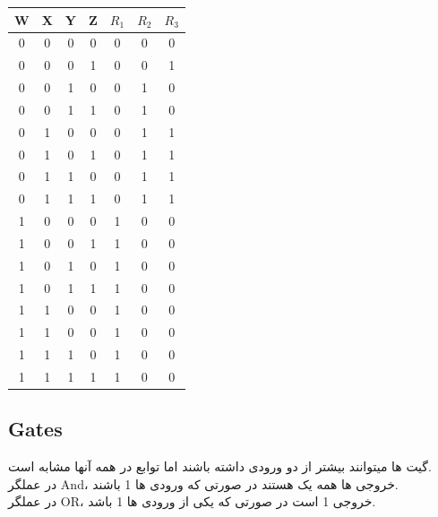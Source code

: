\documentclass[20pt, a4paper]{article}
\begin{document}
\begin{LTR}
	\begin{tabular}{ c c c c | c | c | c}
		W & X & Y & Z & $R_{1}$ & $R_{2}$ & $R_{3}$ \\
		\hline
		0 & 0 & 0 & 0 & 0 & 0 & 0\\
		0 & 0 & 0 & 1 & 0 & 0 & 1\\
		0 & 0 & 1 & 0 & 0 & 1 & 0\\
		0 & 0 & 1 & 1 & 0 & 1 & 0\\
		0 & 1 & 0 & 0 & 0 & 1 & 1\\
		0 & 1 & 0 & 1 & 0 & 1 & 1\\
		0 & 1 & 1 & 0 & 0 & 1 & 1\\
		0 & 1 & 1 & 1 & 0 & 1 & 1\\
		1 & 0 & 0 & 0 & 1 & 0 & 0\\
		1 & 0 & 0 & 1 & 1 & 0 & 0\\
		1 & 0 & 1 & 0 & 1 & 0 & 0\\
		1 & 0 & 1 & 1 & 1 & 0 & 0\\
		1 & 1 & 0 & 0 & 1 & 0 & 0\\
		1 & 1 & 0 & 0 & 1 & 0 & 0\\
		1 & 1 & 1 & 0 & 1 & 0 & 0\\
		1 & 1 & 1 & 1 & 1 & 0 & 0
	\end{tabular}
\end{LTR}



\subsection{Gates}
گیت ها میتوانند بیشتر از دو ورودی داشته باشند اما توابع در همه آنها مشابه است.\\
در عملگر And، خروجی ها همه یک هستند در صورتی که ورودی ها 1 باشند.\\
 در عملگر OR، خروجی 1 است در صورتی که یکی از ورودی ها 1 باشد.\\
\end{document}
